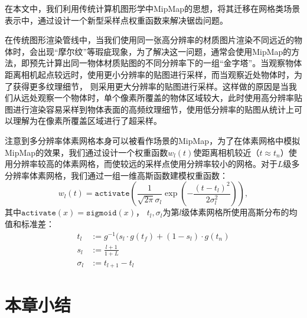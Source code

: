 在本文中，我们利用传统计算机图形学中MipMap\cite{williams_pyramidal_1983}的思想，将其迁移在网格类场景表示中，通过设计一个新型采样点权重函数来解决锯齿问题。

在传统图形渲染管线中，当我们使用同一张高分辨率的材质图片渲染不同远近的物体时，会出现“摩尔纹”等瑕疵现象，为了解决这一问题，通常会使用MipMap的方法，即预先计算出同一物体材质贴图的不同分辨率下的一组“金字塔”。当观察物体距离相机起点较远时，使用更小分辨率的贴图进行采样，而当观察近处物体时，为了获得更多纹理细节， 则采用更大分辨率的贴图进行采样。这样做的原因是当我们从远处观察一个物体时，单个像素所覆盖的物体区域较大，此时使用高分辨率贴图进行渲染容易采样到物体表面的高频纹理细节，使用低分辨率的贴图从统计上可以理解为在像素所覆盖区域进行了超采样。

注意到多分辨率体素网格本身可以被看作场景的MipMap，为了在体素网格中模拟MipMap的效果，我们通过设计一个权重函数$w_l(t)$使距离相机较近（$t\approx t_n$）使用分辨率较高的体素网格，而使较远的采样点使用分辨率较小的网格。对于$L$级多分辨率体素网格，我们通过一组一维高斯函数建模权重函数：
\begin{equation}
    w_l(t) = \mathtt{activate}(\frac{1}{\sqrt{2\pi}\sigma_l}\exp(-\frac{(t-t_l)^2}{2\sigma_l^2})),
\end{equation}
其中$\mathtt{activate}(x) = \mathtt{sigmoid}(x)$， $t_l, \sigma_l$为第$l$级体素网格所使用高斯分布的均值和标准差：
\begin{align}
    t_l &:= g^{-1}(s_l\cdot g(t_f) + (1-s_l)\cdot g(t_n)\\
    s_l &:= \frac{l + 1}{1 + L}\\
    \sigma_l &:= t_{l+1} - t_{l}
\end{align}


\section{本章小结}
